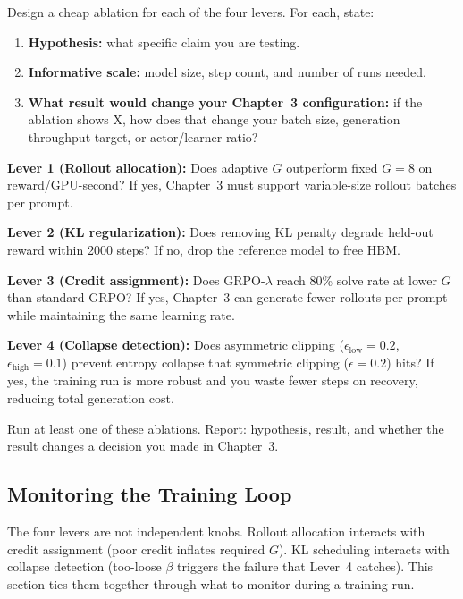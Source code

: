 \begin{exercise}

Design a cheap ablation for each of the four levers. For each, state:
\begin{enumerate}
  \item \textbf{Hypothesis:} what specific claim you are testing.
  \item \textbf{Informative scale:} model size, step count, and number of runs needed.
  \item \textbf{What result would change your Chapter~3 configuration:} if the ablation shows X, how does that change your batch size, generation throughput target, or actor/learner ratio?
\end{enumerate}

\textbf{Lever 1 (Rollout allocation):} Does adaptive $G$ outperform fixed $G = 8$ on reward/GPU-second? If yes, Chapter~3 must support variable-size rollout batches per prompt.

\textbf{Lever 2 (KL regularization):} Does removing KL penalty degrade held-out reward within 2000 steps? If no, drop the reference model to free HBM.

\textbf{Lever 3 (Credit assignment):} Does GRPO-$\lambda$ reach 80\% solve rate at lower $G$ than standard GRPO? If yes, Chapter~3 can generate fewer rollouts per prompt while maintaining the same learning rate.

\textbf{Lever 4 (Collapse detection):} Does asymmetric clipping ($\epsilon_{\mathrm{low}} = 0.2$, $\epsilon_{\mathrm{high}} = 0.1$) prevent entropy collapse that symmetric clipping ($\epsilon = 0.2$) hits? If yes, the training run is more robust and you waste fewer steps on recovery, reducing total generation cost.

Run at least one of these ablations. Report: hypothesis, result, and whether the result changes a decision you made in Chapter~3.
\end{exercise}

\subsection*{Monitoring the Training Loop}

The four levers are not independent knobs. Rollout allocation interacts with credit assignment (poor credit inflates required $G$). KL scheduling interacts with collapse detection (too-loose $\beta$ triggers the failure that Lever~4 catches). This section ties them together through what to monitor during a training run.

